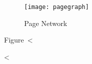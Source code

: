 \documentclass{scrartcl}
\begin{document}
\begin{figure}[htbp]
	\centering
	\texttt{[image: pagegraph]}
	\caption{Page Network}
	\label{fig:page_network}
\end{figure}

Figure~<%





<%
\end{document}
